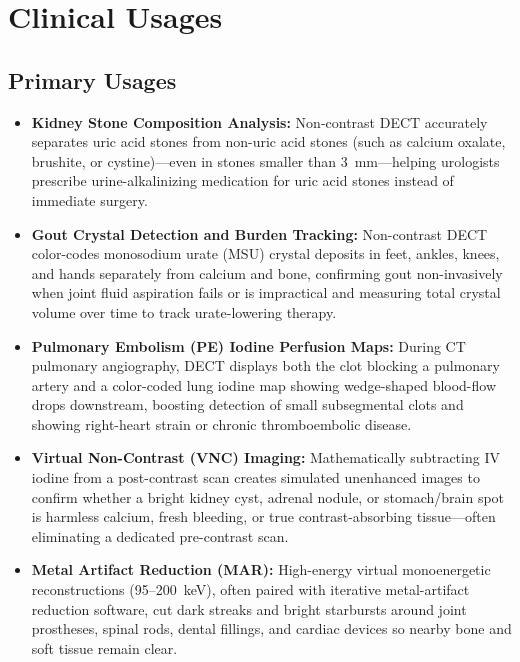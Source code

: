 \section{Clinical Usages}

\subsection{Primary Usages}
\begin{itemize}
\item \textbf{Kidney Stone Composition Analysis:} Non-contrast DECT accurately separates uric acid stones from non-uric acid stones (such as calcium oxalate, brushite, or cystine)---even in stones smaller than 3~mm---helping urologists prescribe urine-alkalinizing medication for uric acid stones instead of immediate surgery.
\item \textbf{Gout Crystal Detection and Burden Tracking:} Non-contrast DECT color-codes monosodium urate (MSU) crystal deposits in feet, ankles, knees, and hands separately from calcium and bone, confirming gout non-invasively when joint fluid aspiration fails or is impractical and measuring total crystal volume over time to track urate-lowering therapy.
\item \textbf{Pulmonary Embolism (PE) Iodine Perfusion Maps:} During CT pulmonary angiography, DECT displays both the clot blocking a pulmonary artery and a color-coded lung iodine map showing wedge-shaped blood-flow drops downstream, boosting detection of small subsegmental clots and showing right-heart strain or chronic thromboembolic disease.
\item \textbf{Virtual Non-Contrast (VNC) Imaging:} Mathematically subtracting IV iodine from a post-contrast scan creates simulated unenhanced images to confirm whether a bright kidney cyst, adrenal nodule, or stomach/brain spot is harmless calcium, fresh bleeding, or true contrast-absorbing tissue---often eliminating a dedicated pre-contrast scan.
\item \textbf{Metal Artifact Reduction (MAR):} High-energy virtual monoenergetic reconstructions (95--200~keV), often paired with iterative metal-artifact reduction software, cut dark streaks and bright starbursts around joint prostheses, spinal rods, dental fillings, and cardiac devices so nearby bone and soft tissue remain clear.
\end{itemize}

